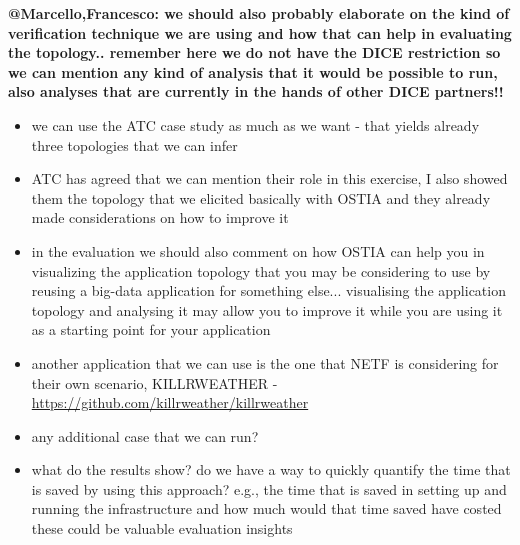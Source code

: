 \textbf{@Marcello,Francesco: we should also probably elaborate on the kind of verification technique we are using and how that can help in evaluating the topology.. remember here we do not have the DICE restriction so we can mention any kind of analysis that it would be possible to run, also analyses that are currently in the hands of other DICE partners!!}

\begin{itemize}
\item we can use the ATC case study as much as we want - that yields already three topologies that we can infer
\item ATC has agreed that we can mention their role in this exercise, I also showed them the topology that we elicited basically with OSTIA and they already made considerations on how to improve it
\item in the evaluation we should also comment on how OSTIA can help you in visualizing the application topology that you may be considering to use by reusing a big-data application for something else... visualising the application topology and analysing it may allow you to improve it while you are using it as a starting point for your application
\item another application that we can use is the one that NETF is considering for their own scenario, KILLRWEATHER - \url{https://github.com/killrweather/killrweather}
\item any additional case that we can run?
\item what do the results show? do we have a way to quickly quantify the time that is saved by using this approach? e.g., the time that is saved in setting up and running the infrastructure and how much would that time saved have costed these could be valuable evaluation insights
\end{itemize}